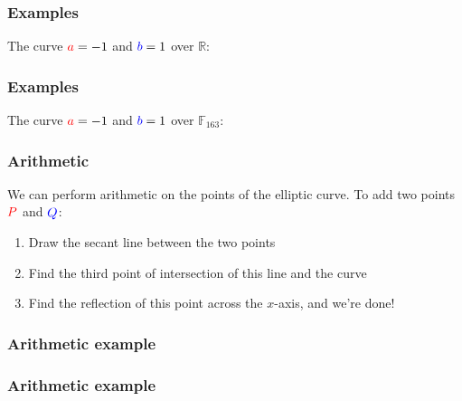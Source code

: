 \documentclass{beamer} %
\theoremstyle{definition} %
\begin{document}
\begin{frame}

\frametitle{Examples}

The curve $\textcolor{red}{a} = -1$ and $\textcolor{blue}{b} = 1$ over $\mathbb{R}$:
                        
\begin{center}
\end{center}

\end{frame}

\begin{frame}

\frametitle{Examples}


The curve $\textcolor{red}{a} = -1$ and $\textcolor{blue}{b} = 1$ over $\mathbb{F}_{163}$:
                        
\begin{center}
\end{center}

\end{frame}

\begin{frame}

\frametitle{Arithmetic}

We can perform arithmetic on the points of the elliptic curve.  To add two points $\textcolor{red}{P}$ and $\textcolor{blue}{Q}$:

\begin{enumerate} 
\item Draw the secant line between the two points
\pause
\item Find the third point of intersection of this line and the curve
\pause
\item Find the reflection of this point across the $x$-axis, and we're done!
\end{enumerate}

\end{frame}

\begin{frame}

\frametitle{Arithmetic example}

\begin{center}
\end{center}

\end{frame}

\begin{frame}

\frametitle{Arithmetic example}

\begin{center}
\end{center}

\end{frame}
\end{document}
